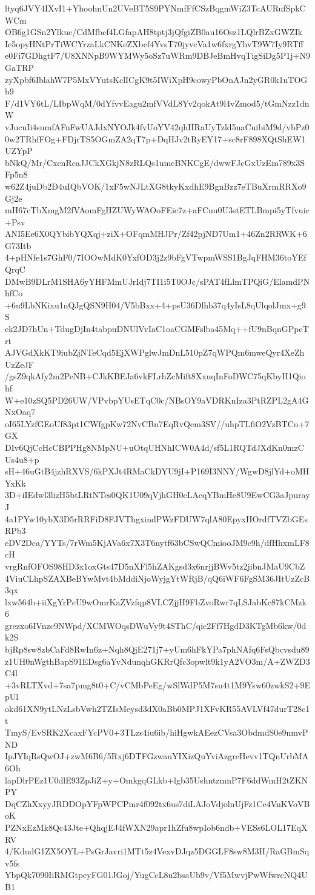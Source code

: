 ltyq6JVY4IXvI1+YhoohnUn2UVeBT5S9PYNmfFfCSzBqgmWiZ3TcAURufSpkCWCm
OB6g1GSn2Ylkuc/CdMfbcf4LGfapAH8tptj3jQfgiZB0au16Osz1LQlrBZxGWZIk
Ie5opyHNtPrTiWCYrzaLkCNKeZXbef4YvsT70jyvcVa1w6fxrgYhvT9W7Iy9RTff
e0Fi7GDhgtF7/U8XNNpB9WYMWy5oSz7uWRm9DBJeBmHvqTigSiDg5P1j+N9GaTRP
zyXpbf6IblahW7P5MxVYutsKclICgK9t5IWiXpH9cowyPbOnAJn2yGR0k1uTOGb9
F/d1VY6tL/LIbpWqM/0dYfvvEagu2mfVVdL8Yv2qokAt9l4vZmod5/tGmNzz1dnW
vJucuIi4sumfAFnFwUAJdxNYOJk4fvUoYV42qhHRaUyTzld5naCuibiM9d/vbPz0
0w2TRhfFOg+FDjrTS5OGmZA2qT7p+DqHJv2tRyEY17+sc8rF898XQtShEW1UZYpP
bNkQ/Mr/CxcnRcaJJCkXGkjN8zRLQs1umeBNKCgE/dwwFJcGxUzEm789x3SFp5n8
w62Z4juDb2D4uIQbVOK/1xF5wNJLtXG8tkyKxdhE9BgnBzz7eTBuXrmRRXo9Gj2e
mH67cTbXmgM2fVAomFgHZUWyWAOoFEic7z+aFCuu0U3stETLBmpi5yTfvuic+Psv
ANI5Ee6X0QYbibYQXqj+ziX+OFqmMHJPr/Zf42pjND7Um1+46Zn2RRWK+6G73Itb
4+pHNfe1s7GhF0/7IOOwMdK0YxfOD3j2z9bFgVTwpmWSS1BgJqFHM36toYEfQrqC
DMwB9DLrM1SHA6yYHFMmUJrIdj7TI1i5T0OJc/sPAT4fLlmTPQiG/ElamdPNhfCo
+6u9LbNKixu1nQJgQSN9H04/V5bBxx+4+psU36Dlhb37q4yIsL8qUlqolJmx+g9S
ek2JD7hUn+TdugDjIn4tabpuDNUlVvIaC1oaCGMFslba45Mq++fU9nBqnGPpeTrt
AJVGdXkKT9iubZjNTeCqd5EjXWPglwJmDnL510pZ7qWPQm6mweQyr4XeZhUzZeJF
/gsZ9qkAfy2m2PeNB+CJkKBEJa6vkFLrhZcMift8XxuqInFoDWC75qKbyH1Qiohf
W+e10zSQ5PD26UW/VPvbpYUsETqC0c/NBsOY9aVDRKnIza3PtRZPL2gA4GNxOaq7
oI65LYzfGEoUf83pt1CWfgpKw72NvCBn7EqRvQem3SV//uhpTLfiO2VzBTCu+7GX
DIv6QjCcHcCBPPHg8NMpNU+uOtqUHNhICW0A4d/sf5L1RQTdJXdKn0mzCUs4u8+p
sH+46uGtB4jzhRXVS/6kPXJt4RMaCkDYU9jI+P169I3NNY/WgwD8jlYd+oMHYxKk
3D+iIEdwl3lizH5btLRtNTes0QK1U09qVjhGH0eLAcqYBmHe8U9EwCG3aJpurayJ
4a1PYw10ybX3D5rRRFiD8FJVThgxindPWzFDUW7qlA80EpyxHOrdfTVZbGEsRPb3
eDV2Dca/YYTs/7rWm5KjAVa6x7X3T6nytf63bCSwQCmiooJM9c9h/dfHhxmLF8cH
vrgRnfOFOS98HD3x1oxGts47D5nXFl5hZAKgsd3x6nrjjBWv5tz2jibnJMaU9CbZ
4ViuCLhpSZAXBeBYwMvt4bMddiNjoWyjgYtWRjB/qQ6iWF6FgSM36JItUzZcB3qx
lxw564b+iiXgYrPcU9wOmrKaZVzfqp8VLCZjjH9FbZvoRwr7qLSJabKc87kCMzk6
grezxo6IVnzc9NWpd/XCMWOqsDWuVy9t4SThC/qic2Ff7HgdD3KTgMb6kw/0dk2S
bjRp8sw8zbCaFd8RwIn6z+Nqh8QjE271j7+yUm6hFkYPa7phNAfq6FsQbcvsdu89
z1UH0nWgthBapS91EDsg6aYvNdunqhGKRrQfc3opwlt9k1yA2VO3m/A+ZWZD3C4l
+3vRLTXvd+7sa7pmg8t0+C/vCMbPeEg/wSlWdP5M7su4t1M9Ysw60zwkS2+9EpUl
okd61XN9ytLNzLsbVwh2TZIsMeysd3dX0aBb0MPJ1XFvKR55AVLVf47durT28c1t
TmyS/EvSRK2XcaxFYcPV0+3TLzs4iu6ib/hiHgwkAEezCVsa3ObdmdS0e9nmvPND
IpJYIqRsQwOJ+zwM6B6/5Rxj6DTFGzwauYIXizQuYviAzgreHevv1TQnUrbMA6Oh
lapDlrPEz1U0dlE93ZpJiZ+y+OmkgqGLkb+lgb35UshntzmnP7F6ddWmH2tZKNPY
DqCZhXxyyJRDDOpYFpWPCPmr4f092tx6us7diLAJoVdjolnUjFz1Ce4VnKVoVBoK
PZNxEzMk8Qc43Jte+QhqjEJ4fWXN29apr1hZfu8wpIob6ndb+VESs6LOL17EqXRV
4/KdudG1ZX5OYL+PsGrJavri1MTt5z4VexvDJqz5DGGLF8sw8M3H/RaGBmSqv5fs
YbpQk7090IiRMGtpeyFG01JGoj/YugCcL8u2bsaUb9v/Vf5MwvjPwWfwrcNQ4UB1
